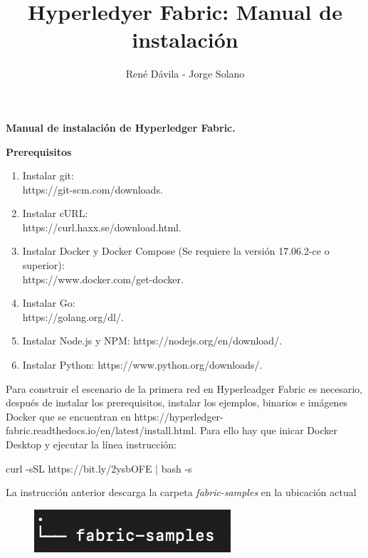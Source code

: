 \documentclass[12pt]{report}
\title{Hyperledyer Fabric: Manual de instalación}
\author{René Dávila - Jorge Solano}
\date{ }
\begin{document}
	\maketitle
	\begin{center}
		\textbf{Manual de instalación de Hyperledger Fabric.}
	\end{center}
	
	\textbf{Prerequisitos}\\
	
	\begin{enumerate}
		\item Instalar git: \\https://git-scm.com/downloads.
		\item Instalar cURL: \\https://curl.haxx.se/download.html.
		\item Instalar Docker y Docker Compose (Se requiere la versión 17.06.2-ce o superior): 
		\\https://www.docker.com/get-docker.
		\item Instalar Go: \\https://golang.org/dl/. 
		\item Instalar Node.js y NPM: https://nodejs.org/en/download/.
		\item Instalar Python: https://www.python.org/downloads/.
	\end{enumerate}

	Para construir el escenario de la primera red en Hyperleadger Fabric es necesario, después de instalar los prerequisitos, instalar los ejemplos, binarios e imágenes Docker que se encuentran en https://hyperledger-fabric.readthedocs.io/en/latest/install.html. Para ello hay que inicar Docker Desktop y ejecutar la línea instrucción:
	\begin{center}
		curl -sSL https://bit.ly/2ysbOFE | bash -s
	\end{center}

	La instrucción anterior descarga la carpeta \textit{fabric-samples} en la ubicación actual\\
	
	\begin{figure}[h]
		\includegraphics[scale=1]{fabric-samples}
		\centering
	\end{figure}
	
\end{document}
